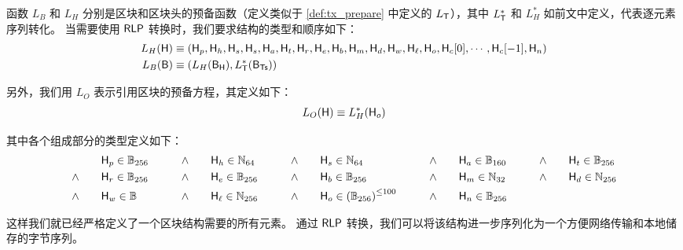 函数 $L_B$ 和 $L_H$ 分别是区块和区块头的预备函数（定义类似于 \cref{def:tx_prepare} 中定义的 $L_{\textsf{T}}$），其中 $L_{\textsf{T}}^*$ 和 $L_H^*$ 如前文中定义，代表逐元素序列转化。
当需要使用 $\mathsf{RLP}$ 转换时，我们要求结构的类型和顺序如下：
%
\begin{align}
	L_H(\textsf{H}) &\equiv \left(\textsf{H}_p,\textsf{H}_h,\textsf{H}_s,\textsf{H}_s,\textsf{H}_a,\textsf{H}_t,\textsf{H}_r,\textsf{H}_e,\textsf{H}_b,\textsf{H}_m,\textsf{H}_d,\textsf{H}_w,\textsf{H}_\ell,\textsf{H}_o,\textsf{H}_c[0],\cdots,\textsf{H}_c[-1],\textsf{H}_n\right)\\
	L_B(\textsf{B}) &\equiv \left( L_H(\textsf{B}_{\textsf{H}}), L_{\textsf{T}}^*(\textsf{B}_{\textsf{Ts}}) \right)
\end{align}

另外，我们用 $L_O$ 表示引用区块的预备方程，其定义如下：
\begin{align*}
	L_O(\textsf{H})\equiv L_H^*(\textsf{H}_o)
\end{align*}

其中各个组成部分的类型定义如下：
\begin{align}
	& \head_p \in \B_{256} 
	\qquad &\land \qquad &\head_h\in \N_{64}
	\qquad &\land \qquad &\head_s\in \N_{64}
	\qquad &\land \qquad &\head_a\in \B_{160}
	\qquad &\land \qquad &\head_t\in \B_{256}
	\notag\\
	\land \qquad &\head_r\in \B_{256}
	\qquad & \land \qquad &\head_e\in \B_{256}
	\qquad &\land \qquad &\head_b\in \B_{256} 
	\qquad &\land \qquad &\head_m\in \N_{32}	
	\qquad &\land \qquad &\head_d\in \N_{256}	
	\notag\\
	\land \qquad &\head_w\in \B
	\qquad &\land \qquad &\head_\ell\in \N_{256}	%
	\qquad &\land \qquad &\head_{o} \in\left(\B_{256}\right)^{\le \numberofommers}
	\qquad &\land \qquad &\head_n\in \B_{256}
\end{align}

这样我们就已经严格定义了一个区块结构需要的所有元素。
通过 $\mathsf{RLP}$ 转换，我们可以将该结构进一步序列化为一个方便网络传输和本地储存的字节序列。

